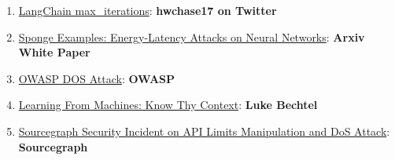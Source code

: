 \documentclass[
]{article}
\providecommand{\tightlist}{%
  \setlength{\itemsep}{0pt}\setlength{\parskip}{0pt}}
\begin{document}
\begin{enumerate}
\def\labelenumi{\arabic{enumi}.}
\tightlist
\item
  \href{https://twitter.com/hwchase17/status/1608467493877579777}{LangChain
  max\_iterations}: \textbf{hwchase17 on Twitter}
\item
  \href{https://arxiv.org/abs/2006.03463}{Sponge Examples:
  Energy-Latency Attacks on Neural Networks}: \textbf{Arxiv White Paper}
\item
  \href{https://owasp.org/www-community/attacks/Denial_of_Service}{OWASP
  DOS Attack}: \textbf{OWASP}
\item
  \href{https://lukebechtel.com/blog/lfm-know-thy-context}{Learning From
  Machines: Know Thy Context}: \textbf{Luke Bechtel}
\item
  \href{https://about.sourcegraph.com/blog/security-update-august-2023}{Sourcegraph
  Security Incident on API Limits Manipulation and DoS Attack}:
  \textbf{Sourcegraph}
\end{enumerate}
\end{document}
